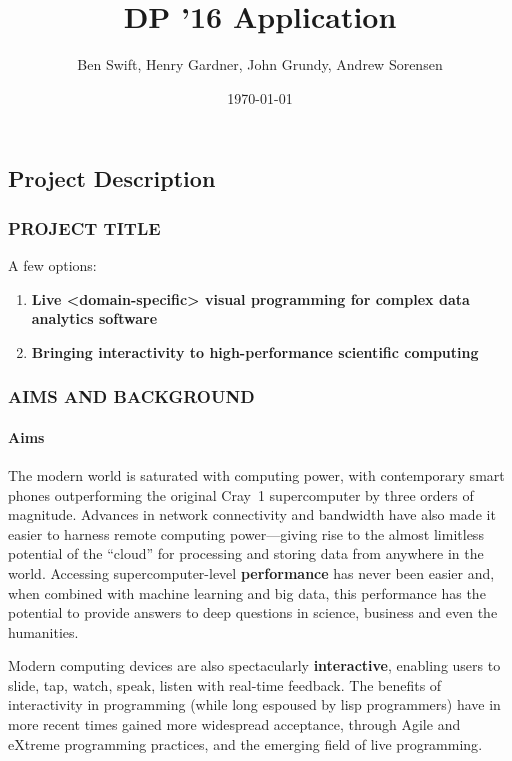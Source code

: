\documentclass[a4paper]{scrartcl}
\author{Ben Swift, Henry Gardner, John Grundy, Andrew Sorensen}
\date{\today}
\title{DP '16 Application}
\begin{document}
\renewcommand{\thesection}{\Alph{section}}

\setcounter{section}{3} %
\subsection{Project Description}
\label{sec:project-description}

\subsubsection*{PROJECT TITLE}

A few options:

\begin{enumerate}
\item \textbf{Live <domain-specific> visual programming for complex
    data analytics software}
\item \textbf{Bringing interactivity to high-performance scientific
    computing}
\end{enumerate}

\subsubsection*{AIMS AND BACKGROUND}

\paragraph*{Aims}

The modern world is saturated with computing power, with contemporary
smart phones outperforming the original Cray~1 supercomputer by three
orders of magnitude. Advances in network connectivity and bandwidth
have also made it easier to harness remote computing power---giving
rise to the almost limitless potential of the ``cloud'' for processing
and storing data from anywhere in the world. Accessing
supercomputer-level \textbf{performance} has never been easier and,
when combined with machine learning\cite{Hastie2009} and big
data\cite{Manyika2011}, this performance has the potential to provide
answers to deep questions in science, business and even the
humanities.

Modern computing devices are also spectacularly \textbf{interactive},
enabling users to slide, tap, watch, speak, listen with real-time
feedback. The benefits of interactivity in programming (while long
espoused by lisp programmers) have in more recent times gained more
widespread acceptance, through Agile\parencite{Fowler2001} and
eXtreme\parencite{Beck1999} programming practices, and the emerging
field of live programming\parencite{Swift2013b}.
\end{document}
